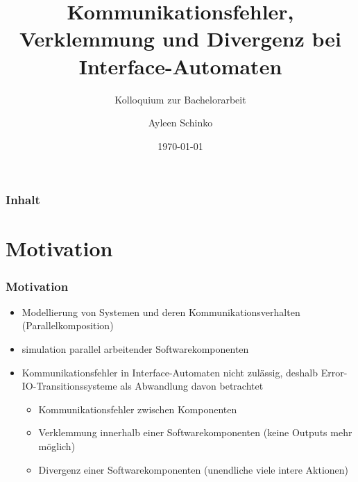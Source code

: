 \documentclass[mathserif, xcolor=dvipsnames]{beamer}
\title{Kommunikationsfehler, Verklemmung und Divergenz bei Interface-Automaten}
\subtitle{Kolloquium zur Bachelorarbeit}
\author{Ayleen Schinko}
\date{\today}
\begin{document}
\begin{frame}[plain]
\maketitle
\end{frame}

\begin{frame}
  \frametitle{Inhalt}
  \tableofcontents{}
\end{frame}

\section{Motivation}
\begin{frame}
  \frametitle{Motivation}
  \begin{itemize}
    \item Modellierung von Systemen und deren Kommunikationsverhalten
      (Parallelkomposition)
    \item simulation parallel arbeitender Softwarekomponenten
    \item Kommunikationsfehler in Interface-Automaten nicht zulässig, deshalb
      Error-IO-Transitionssysteme als Abwandlung davon betrachtet
      \begin{itemize}
        \item Kommunikationsfehler zwischen Komponenten
        \item Verklemmung innerhalb einer Softwarekomponenten (keine Outputs
          mehr möglich)
        \item Divergenz einer Softwarekomponenten (unendliche viele intere
          Aktionen)
      \end{itemize}
  \end{itemize}
\end{frame}




\end{document}
